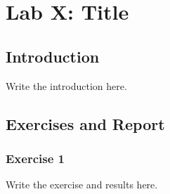 \section{Lab X: Title}
\subsection{Introduction}
Write the introduction here.
\subsection{Exercises and Report}
\subsubsection{Exercise 1}
Write the exercise and results here.
